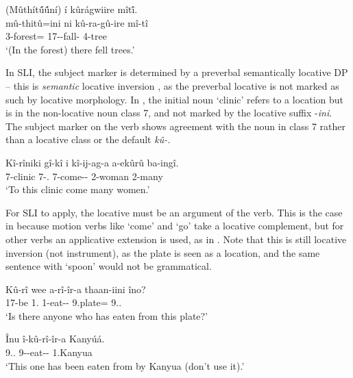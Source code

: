 \documentclass[output=paper]{langscibook}
\begin{document}
\z

\ea
\label{bkm:Ref115792333}
(Mûthít\'{û}\'{û}ní)
 í kûrágwiire mît\'{î}.\\
\gll
mû-thitû=ini  ni  kû-ra-gû-ire  mî-tî\\
3-forest=\LOC{} \FOC{} 17\SM{}-\YPST{}-fall-\PFV{} 4-tree\\
\glt
‘(In the forest) there fell trees.’

\z


In SLI, the subject marker is determined by a preverbal semantically locative DP – this is \textit{semantic} locative inversion \citep{Buell2007}, as the preverbal locative is not marked as such by locative morphology. In , the initial noun ‘clinic’ refers to a location but is in the non-locative noun class 7, and not marked by the locative suffix -\textit{ini}. The subject marker on the verb shows agreement with the noun in class 7 rather than a locative class or the default \textit{kû-.}

\ea
\label{bkm:Ref115794012}\label{bkm:Ref117491937}
\gll
Kî-rîniki  gî-kî  i  kî-ij-ag-a  a-ekûrû  ba-ingî.\\
7-clinic  7-\DEM.\PROX{} \FOC{} 7\SM{}-come-\HAB-\FV{} 2-woman  2-many\\
\glt
‘To this clinic come many women.’ \\
  \citep[7, glosses adapted]{BuellMuriungi2008}

\z

For SLI to apply, the locative must be an argument of the verb. This is the case in  because motion verbs like ‘come’ and ‘go’ take a locative complement, but for other verbs an applicative extension is used, as in . Note that this is still locative inversion (not instrument), as the plate is seen as a location, and the same sentence with ‘spoon’ would not be grammatical.

\ea
\label{bkm:Ref117492511}
\begin{xlist}
\gll
Kû-rî  wee  a-rî-îr-a  thaan-iini  îno?\\
17\SM{}-be  1.\PRO{} 1\SM{}-eat-\APPL-\FV{} 9.plate=\LOC{} 9.\DEM.\PROX{}\\
\glt
‘Is there anyone who has eaten from this plate?’

\gll
Înu  î-kû-rî-îr-a  Kanyúá.\\
9.\DEM.\PROX{}  9\SM-\PRS{}-eat-\APPL-\FV{} 1.Kanyua\\
\glt
‘This one has been eaten from by Kanyua (don’t use it).’

\end{xlist}
\z
\end{document}
